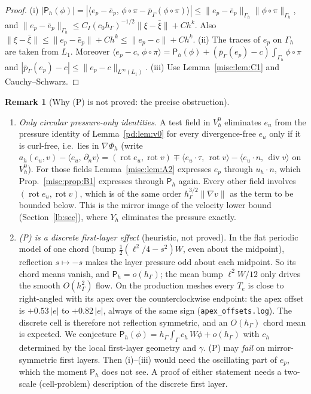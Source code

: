 \documentclass[11pt,reqno]{amsart}
\theoremstyle{plain}
\theoremstyle{definition}
\newtheorem{remark}[theorem]{Remark}
\newcommand{\hG}{h_\Gamma}
\newcommand{\Gh}{\Gamma_h}
\newcommand{\VO}{V_h^0}
\newcommand{\dn}{\partial_n}
\newcommand{\pbG}{\bar p_{\Gamma}}
\newcommand{\ip}[2]{\langle #1,\, #2\rangle}
\newcommand{\norm}[1]{\lVert #1\rVert}
\renewcommand{\div}{\operatorname{div}}
\DeclareMathOperator{\rot}{rot}
\newcommand{\Lay}{L_1}
\newcommand{\Pm}{\mathsf P_h}     %
\newcommand{\Phih}{\Phi_h}        %
\begin{document}
\begin{proof}
(i) $|\Pm(\phi)|=|\ip{e_p-\bar e_p}{\phi\circ\pi-\pbG(\phi\circ\pi)}|\le\norm{e_p-\bar e_p}_{\Gh}\norm{\phi\circ\pi}_{\Gh}$, and $\norm{e_p-\bar e_p}_{\Gh}\le C_I(c_0\hG)^{-1/2}\norm{\xi-\bar\xi}+Ch^k$. Also $\norm{\xi-\bar\xi}\le\norm{e_p-\bar e_p}+Ch^k\le\norm{e_p-c}+Ch^k$. (ii) The traces of $e_p$ on $\Gh$ are taken from $\Lay$. Moreover $\ip{e_p-c}{\phi\circ\pi}=\Pm(\phi)+(\pbG(e_p)-c)\int_{\Gh}\phi\circ\pi$ and $|\pbG(e_p)-c|\le\norm{e_p-c}_{L^\infty(\Lay)}$. (iii) Use Lemma~\ref{misc:lem:C1} and Cauchy--Schwarz.
\end{proof}

\begin{remark}[Why (P) is not proved: the precise obstruction]\label{misc:rem:obstr}
\begin{enumerate}
\item \emph{Only circular pressure-only identities.} A test field in $\VO$ eliminates $e_u$ from the pressure identity of Lemma~\ref{pd:lem:v0} for every divergence-free $e_u$ only if it is curl-free, i.e.\ lies in $\nabla\Phih$ (write $a_h(e_u,v)-\ip{e_u}{\dn v}=(\rot e_u,\rot v)\mp\ip{e_u\cdot\tau}{\rot v}-\ip{e_u\cdot n}{\div v}$ on $\VO$). For those fields Lemma~\ref{misc:lem:A2} expresses $e_p$ through $u_h\cdot n$, which Prop.~\ref{misc:prop:B1} expresses through $\Pm$ again. Every other field involves $(\rot e_u,\rot v)$, which is of the same order $\hG^{3/2}\norm{\nabla v}$ as the term to be bounded below. This is the mirror image of the velocity lower bound (Section~\ref{lb:sec}), where $Y_h$ eliminates the pressure exactly.
\item \emph{(P) is a discrete first-layer effect} (heuristic, not proved). In the flat periodic model of one chord (bump $\frac12(\ell^2/4-s^2)W$, even about the midpoint), reflection $s\mapsto-s$ makes the layer pressure odd about each midpoint. So its chord means vanish, and $\Pm=o(\hG)$; the mean bump $\ell^2W/12$ only drives the smooth $O(\hG^2)$ flow. On the production meshes every $T_e$ is close to right-angled with its apex over the counterclockwise endpoint: the apex offset is $+0.53\,|e|$ to $+0.82\,|e|$, always of the same sign (\texttt{apex\_offsets.log}). The discrete cell is therefore not reflection symmetric, and an $O(\hG)$ chord mean is expected. We conjecture $\Pm(\phi)=\hG\int_\Gamma c_h\,W\phi+o(\hG)$ with $c_h$ determined by the local first-layer geometry and $\gamma$. (P) may \emph{fail} on mirror-symmetric first layers. Then (i)--(iii) would need the oscillating part of $e_p$, which the moment $\Pm$ does not see. A proof of either statement needs a two-scale (cell-problem) description of the discrete first layer.
\end{enumerate}
\end{remark}
\end{document}
